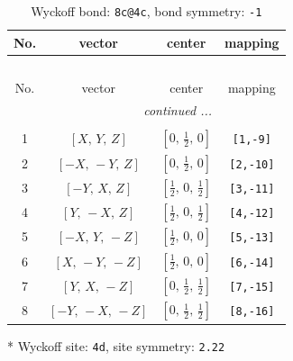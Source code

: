 \documentclass[fleqn,8pt]{jsarticle}
\begin{document}
\renewcommand{\arraystretch}{1.2}
\begin{longtable}{cccc}
\caption{Wyckoff bond: {\tt 8c@4c}, bond symmetry: {\tt -1}}
 \\
 \hline \hline
No. & vector & center & mapping \\ \hline \endfirsthead

\multicolumn{3}{l}{\tablename\ \thetable{}} \\
 \hline \hline
No. & vector & center & mapping \\ \hline \endhead

 \hline \hline
\multicolumn{3}{r}{\footnotesize\it continued ...} \\ \endfoot

 \hline \hline
\multicolumn{3}{r}{} \\ \endlastfoot

1 & $\left[ X,\, Y,\, Z \right]$ & $\left[ 0,\, \frac{1}{2},\, 0 \right]$ & {\tt [1,-9]} \\ \hline
2 & $\left[ - X,\, - Y,\, Z \right]$ & $\left[ 0,\, \frac{1}{2},\, 0 \right]$ & {\tt [2,-10]} \\ \hline
3 & $\left[ - Y,\, X,\, Z \right]$ & $\left[ \frac{1}{2},\, 0,\, \frac{1}{2} \right]$ & {\tt [3,-11]} \\ \hline
4 & $\left[ Y,\, - X,\, Z \right]$ & $\left[ \frac{1}{2},\, 0,\, \frac{1}{2} \right]$ & {\tt [4,-12]} \\ \hline
5 & $\left[ - X,\, Y,\, - Z \right]$ & $\left[ \frac{1}{2},\, 0,\, 0 \right]$ & {\tt [5,-13]} \\ \hline
6 & $\left[ X,\, - Y,\, - Z \right]$ & $\left[ \frac{1}{2},\, 0,\, 0 \right]$ & {\tt [6,-14]} \\ \hline
7 & $\left[ Y,\, X,\, - Z \right]$ & $\left[ 0,\, \frac{1}{2},\, \frac{1}{2} \right]$ & {\tt [7,-15]} \\ \hline
8 & $\left[ - Y,\, - X,\, - Z \right]$ & $\left[ 0,\, \frac{1}{2},\, \frac{1}{2} \right]$ & {\tt [8,-16]} \\
\end{longtable}
* Wyckoff site: {\tt 4d}, site symmetry: {\tt 2.22}
\renewcommand{\arraystretch}{1.2}
\end{document}
